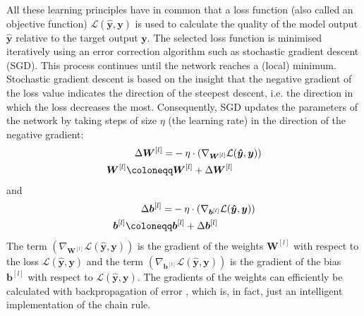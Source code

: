 All these learning principles have in common that a loss function \cite{wang_comprehensive_2022} (also called an objective function) $\mathcal{L}(\boldsymbol{\hat{y}}, \boldsymbol{y})$ is used to calculate the quality of the model output $\boldsymbol{\hat{y}}$ relative to the target output $\boldsymbol{y}$.
The selected loss function is minimised iteratively using an error correction algorithm such as stochastic gradient descent (SGD). This process continues until the network reaches a (local) minimum.
Stochastic gradient descent is based on the insight that the negative gradient of the loss value indicates the direction of the steepest descent, i.e. the direction in which the loss decreases the most. Consequently, SGD updates the parameters of the network by taking steps of size $\eta$ (the learning rate) in the direction of the negative gradient:
%
\begin{align}\eqlbl{sgd}
	\begin{aligned}
		\Delta \boldsymbol{W}^{[l]} = & -\eta \cdot \left( \nabla_{\boldsymbol{W}^{[l]}} \mathcal{L}(\boldsymbol{\hat{y}}, \boldsymbol{y}) \right)\\
		\boldsymbol{W}^{[l]} \coloneqq & \boldsymbol{W}^{[l]} + \Delta \boldsymbol{W}^{[l]}
	\end{aligned}
\end{align}
%
and
%	
\begin{align}\eqlbl{sgd2}	
	\begin{aligned}
		\Delta \boldsymbol{b}^{[l]} = & -\eta \cdot \left( \nabla_{\boldsymbol{b}^{[l]}} \mathcal{L}(\boldsymbol{\hat{y}}, \boldsymbol{y}) \right)\\
		\boldsymbol{b}^{[l]} \coloneqq & \boldsymbol{b}^{[l]} + \Delta \boldsymbol{b}^{[l]}
	\end{aligned}
\end{align}
%
The term $\left( \nabla_{\boldsymbol{W}^{[l]}} \mathcal{L}(\boldsymbol{\hat{y}}, \boldsymbol{y}) \right)$ is the gradient of the weights $\boldsymbol{W}^{[l]}$  with respect to the loss $\mathcal{L}(\boldsymbol{\hat{y}}, \boldsymbol{y})$ and the term $\left( \nabla_{\boldsymbol{b}^{[l]}} \mathcal{L}(\boldsymbol{\hat{y}}, \boldsymbol{y}) \right)$ is the gradient of the bias \(\boldsymbol{b}^{[l]}\)  with respect to $\mathcal{L}(\boldsymbol{\hat{y}}, \boldsymbol{y})$.
The gradients of the weights can efficiently be calculated with backpropagation of error , which is, in fact, just an intelligent implementation of the chain rule.

